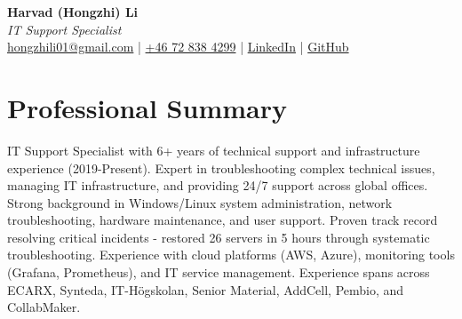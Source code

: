 \documentclass[11pt,a4paper]{article}
\begin{document}
\begin{center}
{\LARGE \textbf{Harvad (Hongzhi) Li}}\\[10pt]
{\Large \textit{IT Support Specialist}}\\[10pt]
\textcolor{titlecolor}{\href{mailto:hongzhili01@gmail.com}{hongzhili01@gmail.com} | \href{tel:+46728384299}{+46 72 838 4299} | \href{https://www.linkedin.com/in/harvad/}{LinkedIn} | \href{https://github.com/bluehawana}{GitHub}}
\end{center}

\vspace{8pt}

\section*{Professional Summary}
IT Support Specialist with 6+ years of technical support and infrastructure experience (2019-Present). Expert in troubleshooting complex technical issues, managing IT infrastructure, and providing 24/7 support across global offices. Strong background in Windows/Linux system administration, network troubleshooting, hardware maintenance, and user support. Proven track record resolving critical incidents - restored 26 servers in 5 hours through systematic troubleshooting. Experience with cloud platforms (AWS, Azure), monitoring tools (Grafana, Prometheus), and IT service management. Experience spans across ECARX, Synteda, IT-Högskolan, Senior Material, AddCell, Pembio, and CollabMaker.
\end{document}
